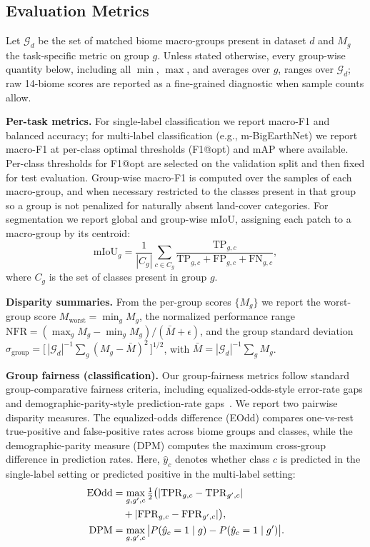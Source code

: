 \documentclass[10pt,twocolumn,letterpaper]{article}
\begin{document}
\subsection{Evaluation Metrics}
Let $\mathcal{G}_d$ be the set of matched biome macro-groups present in dataset $d$ and $M_g$ the task-specific metric on group $g$. Unless stated otherwise, every group-wise quantity below, including all $\min$, $\max$, and averages over $g$, ranges over $\mathcal{G}_d$; raw 14-biome scores are reported as a fine-grained diagnostic when sample counts allow.

\smallskip
\textbf{Per-task metrics.} For single-label classification we report macro-F1 and balanced accuracy; for multi-label classification (e.g., m-BigEarthNet) we report macro-F1 at per-class optimal thresholds (F1@opt) and mAP where available. Per-class thresholds for F1@opt are selected on the validation split and then fixed for test evaluation. Group-wise macro-F1 is computed over the samples of each macro-group, and when necessary restricted to the classes present in that group so a group is not penalized for naturally absent land-cover categories. For segmentation we report global and group-wise mIoU, assigning each patch to a macro-group by its centroid:
\begin{equation}
\mathrm{mIoU}_g = \frac{1}{|C_g|}\sum_{c\in C_g}\frac{\mathrm{TP}_{g,c}}{\mathrm{TP}_{g,c}+\mathrm{FP}_{g,c}+\mathrm{FN}_{g,c}},
\end{equation}
where $C_g$ is the set of classes present in group $g$.

\smallskip
\textbf{Disparity summaries.} From the per-group scores $\{M_g\}$ we report the worst-group score $M_{\mathrm{worst}}=\min_g M_g$, the normalized performance range $\mathrm{NFR}=(\max_g M_g-\min_g M_g)/(\bar M+\epsilon)$, and the group standard deviation $\sigma_{\mathrm{group}}=\big[\,|\mathcal{G}_d|^{-1}\sum_g (M_g-\bar M)^2\,\big]^{1/2}$, with $\bar M=|\mathcal{G}_d|^{-1}\sum_g M_g$.

\smallskip
\textbf{Group fairness (classification).}
Our group-fairness metrics follow standard group-comparative fairness criteria, including equalized-odds-style error-rate gaps and demographic-parity-style prediction-rate gaps~\cite{hardt2016equality,woodworth2017learning}. We report two pairwise disparity measures. The equalized-odds difference (EOdd) compares one-vs-rest true-positive and false-positive rates across biome groups and classes, while the demographic-parity measure (DPM) computes the maximum cross-group difference in prediction rates. Here, $\hat{y}_c$ denotes whether class $c$ is predicted in the single-label setting or predicted positive in the multi-label setting:
\begin{align}
\mathrm{EOdd} &= \max_{g,g',c}\tfrac{1}{2}\big(|\mathrm{TPR}_{g,c}-\mathrm{TPR}_{g',c}|\notag\\
&\quad+|\mathrm{FPR}_{g,c}-\mathrm{FPR}_{g',c}|\big),\\
\mathrm{DPM} &= \max_{g,g',c}\big|P(\hat{y}_c=1\mid g)-P(\hat{y}_c=1\mid g')\big|.
\end{align}
\end{document}
